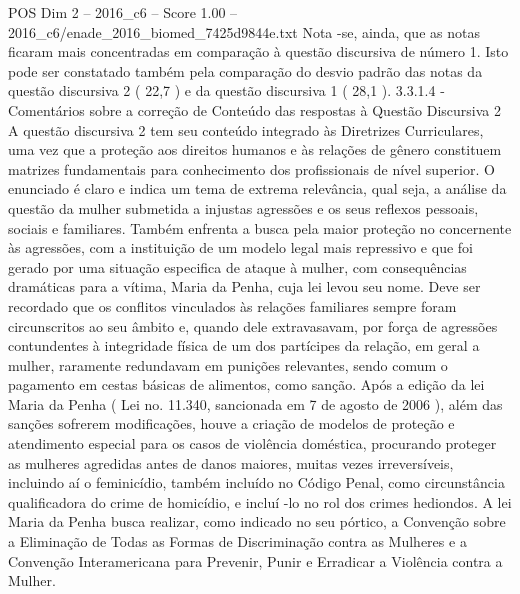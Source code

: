 \begin{textsample}{POS Dim 2 – 2016\_c6 – Score 1.00 – 2016\_c6/enade\_2016\_biomed\_7425d9844e.txt}
Nota -se, ainda, que as notas ficaram mais concentradas em comparação à questão discursiva de número 1.
Isto pode ser constatado também pela comparação do desvio padrão das notas da questão discursiva 2 ( 22,7 ) e da questão discursiva 1 ( 28,1 ). 3.3.1.4 - Comentários sobre a correção de Conteúdo das respostas à Questão Discursiva 2 A questão discursiva 2 tem seu conteúdo integrado às Diretrizes Curriculares, uma vez que a proteção aos direitos humanos e às relações de gênero constituem matrizes fundamentais para conhecimento dos profissionais de nível superior.
O enunciado é claro e indica um tema de extrema relevância, qual seja, a análise da questão da mulher submetida a injustas agressões e os seus reflexos pessoais, sociais e familiares.
Também enfrenta a busca pela maior proteção no concernente às agressões, com a instituição de um modelo legal mais repressivo e que foi gerado por uma situação especifica de ataque à mulher, com consequências dramáticas para a vítima, Maria da Penha, cuja lei levou seu nome.
Deve ser recordado que os conflitos vinculados às relações familiares sempre foram circunscritos ao seu âmbito e, quando dele extravasavam, por força de agressões contundentes à integridade física de um dos partícipes da relação, em geral a mulher, raramente redundavam em punições relevantes, sendo comum o pagamento em cestas básicas de alimentos, como sanção.
Após a edição da lei Maria da Penha ( Lei no. 11.340, sancionada em 7 de agosto de 2006 ), além das sanções sofrerem modificações, houve a criação de modelos de proteção e atendimento especial para os casos de violência doméstica, procurando proteger as mulheres agredidas antes de danos maiores, muitas vezes irreversíveis, incluindo aí o feminicídio, também incluído no Código Penal, como circunstância qualificadora do crime de homicídio, e incluí -lo no rol dos crimes hediondos.
A lei Maria da Penha busca realizar, como indicado no seu pórtico, a Convenção sobre a Eliminação de Todas as Formas de Discriminação contra as Mulheres e a Convenção Interamericana para Prevenir, Punir e Erradicar a Violência contra a Mulher.

\end{textsample}

